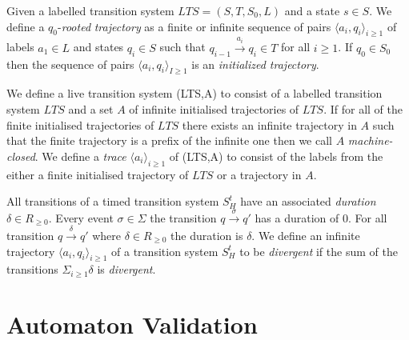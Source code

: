 \medskip
\begin{mydef}
Given a labelled transition system $LTS = (S,T,S_0,L)$ and a state $s \in S$. We define a $q_0$-\emph{rooted} \emph{trajectory} as a finite or infinite sequence of pairs $\langle a_i, q_i \rangle_{i \geq 1}$ of labels $a_1 \in L$ and states $q_i \in S$  such that $q_{i-1} \xrightarrow{a_i} q_{i} \in T$ for all $i \geq 1$. If $q_0 \in S_0$ then the sequence of pairs $\langle a_i, q_i \rangle_{I \geq 1}$ is an \emph{initialized trajectory}. 
\end{mydef}
\medskip
\begin{mydef}
We define a live transition system (LTS,A) to consist of a labelled transition system $LTS$ and a set $A$ of infinite initialised trajectories of $LTS$. If for all of the finite initialised trajectories of $LTS$ there exists an infinite trajectory in $A$ such that the finite trajectory is a prefix of the infinite one then we call $A$ \emph{machine-closed}. We define a \emph{trace} $\langle a_i \rangle_{i \geq 1}$ of (LTS,A) to consist of the labels from the either a finite initialised trajectory of $LTS$ or a trajectory in $A$.
\end{mydef}
\medskip

\begin{mydef}
All transitions of a timed transition system $S^t_H$ have an associated \emph{duration} $\delta \in R_{\geq 0}$. Every event $\sigma \in \Sigma$ the transition $q \xrightarrow{\sigma} q'$ has a duration of 0. For all transition $q \xrightarrow{\delta} q'$ where $\delta \in R_{\geq 0}$ the duration is $\delta$.  We define an infinite trajectory $\langle a_i, q_i \rangle_{i \geq 1}$ of a transition system $S^t_H$ to be \emph{divergent} if the sum of the transitions $\Sigma_{i \geq 1} \delta$ is \emph{divergent}.
 \end{mydef}

\section{Automaton Validation}


